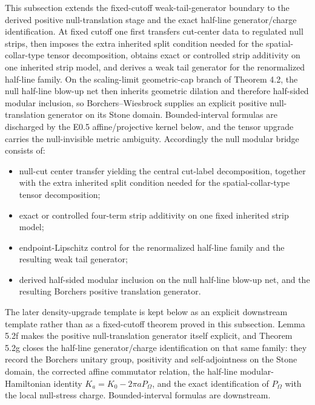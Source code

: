 This subsection extends the fixed-cutoff weak-tail-generator boundary to the derived positive null-translation stage and the exact half-line generator/charge identification. At fixed cutoff one first transfers cut-center data to regulated null strips, then imposes the extra inherited split condition needed for the spatial-collar-type tensor decomposition, obtains exact or controlled strip additivity on one inherited strip model, and derives a weak tail generator for the renormalized half-line family. On the scaling-limit geometric-cap branch of Theorem 4.2, the null half-line blow-up net then inherits geometric dilation and therefore half-sided modular inclusion, so Borchers--Wiesbrock supplies an explicit positive null-translation generator on its Stone domain. Bounded-interval formulas are discharged by the E0.5 affine/projective kernel below, and the tensor upgrade carries the null-invisible metric ambiguity. Accordingly the null modular bridge consists of:
\begin{itemize}
\tightlist
\item
  null-cut center transfer yielding the central cut-label decomposition, together with the extra inherited split condition needed for the spatial-collar-type tensor decomposition;
\item
  exact or controlled four-term strip additivity on one fixed inherited strip model;
\item
  endpoint-Lipschitz control for the renormalized half-line family and the resulting weak tail generator;
\item
  derived half-sided modular inclusion on the null half-line blow-up net, and the resulting Borchers positive translation generator.
\end{itemize}
The later density-upgrade template is kept below as an explicit downstream template rather than as a fixed-cutoff theorem proved in this subsection. Lemma 5.2f makes the positive null-translation generator itself explicit, and Theorem 5.2g closes the half-line generator/charge identification on that same family: they record the Borchers unitary group, positivity and self-adjointness on the Stone domain, the corrected affine commutator relation, the half-line modular-Hamiltonian identity \(K_a=K_0-2\pi aP_\Omega\), and the exact identification of \(P_\Omega\) with the local null-stress charge. Bounded-interval formulas are downstream.

